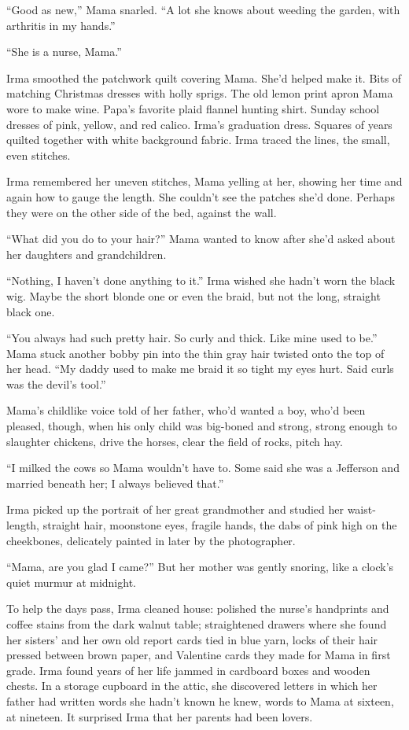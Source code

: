\documentclass[twoside,10pt]{book}
\begin{document}
``Good as new,'' Mama snarled. ``A lot she knows about weeding the
garden, with arthritis in my hands.''

``She is a nurse, Mama.''

Irma smoothed the patchwork quilt covering Mama. She'd helped make it.
Bits of matching Christmas dresses with holly sprigs. The old lemon
print apron Mama wore to make wine. Papa's favorite plaid flannel
hunting shirt. Sunday school dresses of pink, yellow, and red calico.
Irma's gradu­ation dress. Squares of years quilted together with white
background fabric. Irma traced the lines, the small, even stitches.

Irma remembered her uneven stitches, Mama yelling at her, showing her
time and again how to gauge the length. She couldn't see the patches
she'd done. Perhaps they were on the other side of the bed, against the
wall.

``What did you do to your hair?'' Mama wanted to know after she'd asked
about her daughters and grandchildren.

``Nothing, I haven't done anything to it.'' Irma wished she hadn't worn
the black wig. Maybe the short blonde one or even the braid, but not the
long, straight black one.

``You always had such pretty hair. So curly and thick. Like mine used to
be.'' Mama stuck another bobby pin into the thin gray hair twisted onto
the top of her head. ``My daddy used to make me braid it so tight my
eyes hurt. Said curls was the devil's tool.''

Mama's childlike voice told of her father, who'd wanted a boy, who'd
been pleased, though, when his only child was big-boned and strong,
strong enough to slaughter chickens, drive the horses, clear the field
of rocks, pitch hay.

``I milked the cows so Mama wouldn't have to. Some said she was a
Jefferson and married beneath her; I always believed that.''

Irma picked up the portrait of her great grandmother and studied her
waist-length, straight hair, moonstone eyes, fragile hands, the dabs of
pink high on the cheekbones, delicately painted in later by the
photographer.

``Mama, are you glad I came?'' But her mother was gently snoring, like a
clock's quiet murmur at midnight.

To help the days pass, Irma cleaned house: polished the nurse's
handprints and coffee stains from the dark walnut table; straightened
drawers where she found her sisters' and her own old report cards tied
in blue yarn, locks of their hair pressed between brown paper, and
Valentine cards they made for Mama in first grade. Irma found years of
her life jammed in cardboard boxes and wooden chests. In a storage
cupboard in the attic, she discovered letters in which her father had
written words she hadn't known he knew, words to Mama at sixteen, at
nineteen. It surprised Irma that her parents had been lovers.
\end{document}
